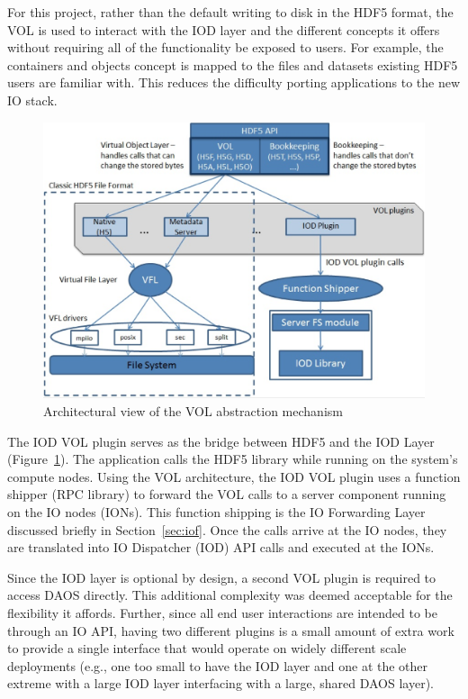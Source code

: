 \documentclass[conference]{IEEEtran} \pdfpagewidth=8.5in
\begin{document}
For this project, rather than the default writing to disk in the HDF5 format,
the VOL is used to interact with the IOD layer and the different concepts it
offers without requiring all of the functionality be exposed to users. For
example, the containers and objects concept is mapped to the files and datasets
existing HDF5 users are familiar with.  This reduces the difficulty porting
applications to the new IO stack.

\begin{figure}[htbp]
\centering
\includegraphics[width=\columnwidth]{images/vol-arch.png}
\caption{Architectural view of the VOL abstraction mechanism}
\label{fig:vol-arch}
\end{figure}

The IOD VOL plugin serves as the bridge between HDF5 and the IOD Layer
(Figure~\ref{fig:vol-arch}). The application calls the HDF5 library while
running on the system's compute nodes. Using the VOL architecture, the IOD VOL
plugin uses a function shipper (RPC library) to forward the VOL calls to a
server component running on the IO nodes (IONs). This function shipping is the
IO Forwarding Layer discussed briefly in Section~\ref{sec:iof}. Once the calls
arrive at the IO nodes, they are translated into IO Dispatcher (IOD) API calls
and executed at the IONs.

Since the IOD layer is optional by design, a second VOL plugin is required to
access DAOS directly. This additional complexity was deemed acceptable for the
flexibility it affords. Further, since all end user interactions are intended
to be through an IO API, having two different plugins is a small amount of
extra work to provide a single interface that would operate on widely different
scale deployments (e.g., one too small to have the IOD layer and one at the
other extreme with a large IOD layer interfacing with a large, shared DAOS
layer).
\end{document}
